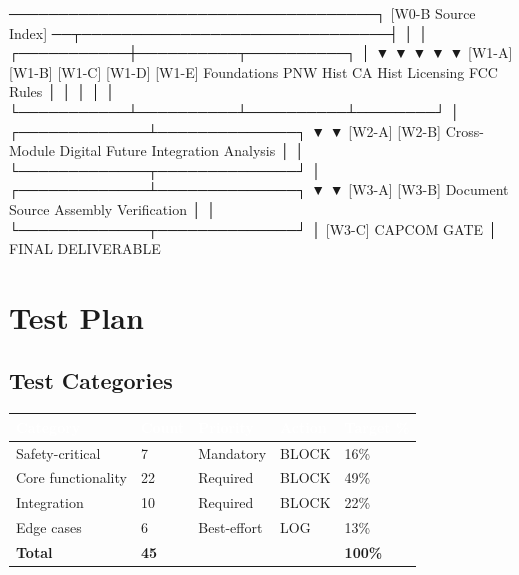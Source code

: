 \documentclass[11pt,letterpaper]{article}
\newcommand{\tableheader}[1]{\textbf{\sffamily\textcolor{white}{#1}}}
\begin{document}
\begin{asciibox}
\begin{asciibox}
  [W0-A Schema] ─────────────────────────────────────┐
  [W0-B Source Index] ──┬───────────────────────────────┤
                        │                               │
            ┌───────────┼──────────┬──────────┐        │
            ▼           ▼          ▼          ▼        ▼
         [W1-A]     [W1-B]     [W1-C]    [W1-D]   [W1-E]
         Foundations PNW Hist  CA Hist  Licensing  FCC Rules
            │           │          │          │        │
            └───────────┴──────────┴──────────┴────────┘
                                  │
                    ┌─────────────┴──────────────┐
                    ▼                            ▼
                 [W2-A]                       [W2-B]
                Cross-Module               Digital Future
                Integration                  Analysis
                    │                            │
                    └─────────────┬──────────────┘
                                  │
                    ┌─────────────┴──────────────┐
                    ▼                            ▼
                 [W3-A]                       [W3-B]
                Document                     Source
                Assembly                  Verification
                    │                            │
                    └─────────────┬──────────────┘
                                  │
                              [W3-C]
                           CAPCOM GATE
                                  │
                        FINAL DELIVERABLE
\end{asciibox}

\section{Test Plan}

\subsection{Test Categories}

\begin{center}
\begin{tabularx}{\textwidth}{L{3cm}C{2cm}L{2cm}C{2cm}L{3cm}}
\toprule
{}
\tableheader{Category} & \tableheader{Count} & \tableheader{Priority} & \tableheader{Action} & \tableheader{Target \%} \\
\midrule
Safety-critical & 7 & Mandatory & BLOCK & 16\% \\
Core functionality & 22 & Required & BLOCK & 49\% \\
Integration & 10 & Required & BLOCK & 22\% \\
Edge cases & 6 & Best-effort & LOG & 13\% \\
\textbf{Total} & \textbf{45} & & & \textbf{100\%} \\
\bottomrule
\end{tabularx}
\end{center}


\end{asciibox}
\end{document}
